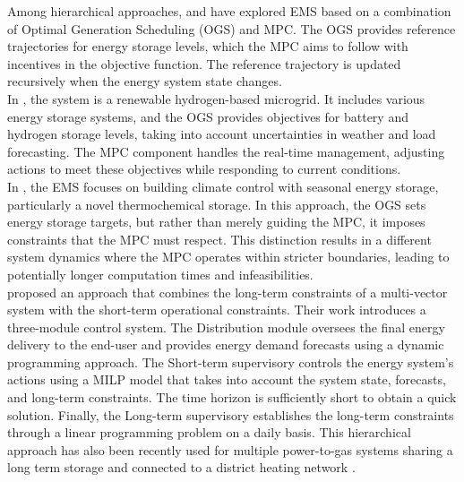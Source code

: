 Among hierarchical approaches, \cite{petrollese_real-time_2016} and \cite{weber_model_2022} have explored EMS based on a combination of Optimal Generation Scheduling (OGS) and MPC. The OGS provides reference trajectories for energy storage levels, which the MPC aims to follow with incentives in the objective function. The reference trajectory is updated recursively when the energy system state changes.
\\
In \cite{petrollese_real-time_2016}, the system is a renewable hydrogen-based microgrid. It includes various energy storage systems, and the OGS provides objectives for battery and hydrogen storage levels, taking into account uncertainties in weather and load forecasting. The MPC component handles the real-time management, adjusting actions to meet these objectives while responding to current conditions.
\\
In \cite{weber_model_2022}, the EMS focuses on building climate control with seasonal energy storage, particularly a novel thermochemical storage. In this approach, the OGS sets energy storage targets, but rather than merely guiding the MPC, it imposes constraints that the MPC must respect. This distinction results in a different system dynamics where the MPC operates within stricter boundaries, leading to potentially longer computation times and infeasibilities.
\\
\cite{saletti_smart_2022} proposed an approach that combines the long-term constraints of a multi-vector system with the short-term operational constraints. Their work introduces a three-module control system. The Distribution module oversees the final energy delivery to the end-user and provides energy demand forecasts using a dynamic programming approach. The Short-term supervisory controls the energy system's actions using a MILP model that takes into account the system state, forecasts, and long-term constraints. The time horizon is sufficiently short to obtain a quick solution. Finally, the Long-term supervisory establishes the long-term constraints through a linear programming problem on a daily basis. This hierarchical approach has also been recently used for multiple power-to-gas systems sharing a long term storage and connected to a district heating network \citep{MARZI2024100143}.
\\

